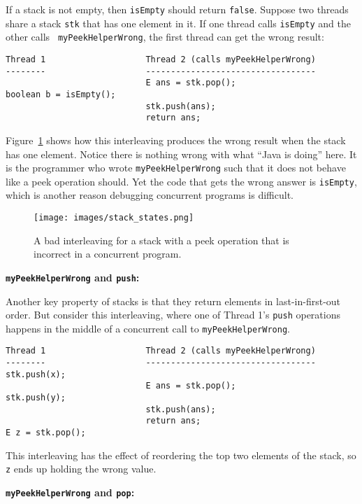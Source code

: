 \documentclass[10pt]{article}
\begin{document}
If a stack is not empty, then {\tt isEmpty} should return {\tt false}.
Suppose two threads share a stack {\tt stk} that has one element in
it.  If one thread calls {\tt isEmpty} and the other calls {\tt
  myPeekHelperWrong}, the first thread can get the wrong result:
\begin{verbatim}
Thread 1                    Thread 2 (calls myPeekHelperWrong)
--------                    ----------------------------------
                            E ans = stk.pop();
boolean b = isEmpty();
                            stk.push(ans);
                            return ans;
\end{verbatim}
Figure~\ref{fig:stack_states} shows how this interleaving produces the
wrong result when the stack has one element.  Notice there is nothing wrong with what ``Java is doing'' here.  It is
the programmer who wrote {\tt myPeekHelperWrong} such that it
does not behave like a peek operation should.  Yet the code that gets the
wrong answer is {\tt isEmpty}, which is another reason debugging
concurrent programs is difficult.

\begin{figure}
\begin{center}
\texttt{[image: images/stack\_states.png]}
\end{center}
\caption{A bad interleaving for a stack with a peek operation that is
  incorrect in a concurrent program.}
\label{fig:stack_states}
\end{figure}


\medskip
\noindent\textbf{{\tt myPeekHelperWrong} and {\tt push}:}
\medskip

Another key property of stacks is that they return elements in
last-in-first-out order.  But consider this interleaving, where one of
Thread 1's {\tt push} operations happens in the middle of a concurrent
call to {\tt myPeekHelperWrong}.
\begin{verbatim}
Thread 1                    Thread 2 (calls myPeekHelperWrong)
--------                    ----------------------------------
stk.push(x);
                            E ans = stk.pop();
stk.push(y);
                            stk.push(ans);
                            return ans;
E z = stk.pop();
\end{verbatim}
This interleaving has the effect of reordering the top two elements of
the stack, so {\tt z} ends up holding the wrong value.

\medskip
\noindent\textbf{{\tt myPeekHelperWrong} and {\tt pop}:}
\medskip
\end{document}
